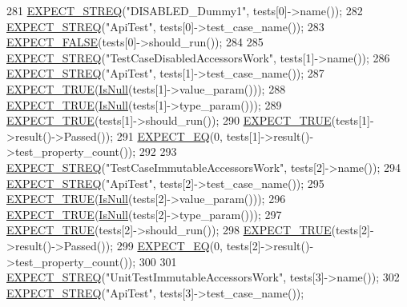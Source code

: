 \begin{DoxyCode}
281     \hyperlink{gtest_8h_ad20f7b94ac5081e16f0005b94e95f0c6}{EXPECT\_STREQ}(\textcolor{stringliteral}{"DISABLED\_Dummy1"}, tests[0]->name());
282     \hyperlink{gtest_8h_ad20f7b94ac5081e16f0005b94e95f0c6}{EXPECT\_STREQ}(\textcolor{stringliteral}{"ApiTest"}, tests[0]->test\_case\_name());
283     \hyperlink{gtest_8h_aeb6c7ae89f440c90c1a1815951c836da}{EXPECT\_FALSE}(tests[0]->should\_run());
284 
285     \hyperlink{gtest_8h_ad20f7b94ac5081e16f0005b94e95f0c6}{EXPECT\_STREQ}(\textcolor{stringliteral}{"TestCaseDisabledAccessorsWork"}, tests[1]->name());
286     \hyperlink{gtest_8h_ad20f7b94ac5081e16f0005b94e95f0c6}{EXPECT\_STREQ}(\textcolor{stringliteral}{"ApiTest"}, tests[1]->test\_case\_name());
287     \hyperlink{gtest_8h_ac33e7cdfb5d44a7a0f0ab552eb5c3c6a}{EXPECT\_TRUE}(\hyperlink{namespacetesting_1_1internal_adcfd37a66bc4cb0e8291cf46e1a6c72b}{IsNull}(tests[1]->value\_param()));
288     \hyperlink{gtest_8h_ac33e7cdfb5d44a7a0f0ab552eb5c3c6a}{EXPECT\_TRUE}(\hyperlink{namespacetesting_1_1internal_adcfd37a66bc4cb0e8291cf46e1a6c72b}{IsNull}(tests[1]->type\_param()));
289     \hyperlink{gtest_8h_ac33e7cdfb5d44a7a0f0ab552eb5c3c6a}{EXPECT\_TRUE}(tests[1]->should\_run());
290     \hyperlink{gtest_8h_ac33e7cdfb5d44a7a0f0ab552eb5c3c6a}{EXPECT\_TRUE}(tests[1]->result()->Passed());
291     \hyperlink{gtest_8h_a4159019abda84f5366acdb7604ff220a}{EXPECT\_EQ}(0, tests[1]->result()->test\_property\_count());
292 
293     \hyperlink{gtest_8h_ad20f7b94ac5081e16f0005b94e95f0c6}{EXPECT\_STREQ}(\textcolor{stringliteral}{"TestCaseImmutableAccessorsWork"}, tests[2]->name());
294     \hyperlink{gtest_8h_ad20f7b94ac5081e16f0005b94e95f0c6}{EXPECT\_STREQ}(\textcolor{stringliteral}{"ApiTest"}, tests[2]->test\_case\_name());
295     \hyperlink{gtest_8h_ac33e7cdfb5d44a7a0f0ab552eb5c3c6a}{EXPECT\_TRUE}(\hyperlink{namespacetesting_1_1internal_adcfd37a66bc4cb0e8291cf46e1a6c72b}{IsNull}(tests[2]->value\_param()));
296     \hyperlink{gtest_8h_ac33e7cdfb5d44a7a0f0ab552eb5c3c6a}{EXPECT\_TRUE}(\hyperlink{namespacetesting_1_1internal_adcfd37a66bc4cb0e8291cf46e1a6c72b}{IsNull}(tests[2]->type\_param()));
297     \hyperlink{gtest_8h_ac33e7cdfb5d44a7a0f0ab552eb5c3c6a}{EXPECT\_TRUE}(tests[2]->should\_run());
298     \hyperlink{gtest_8h_ac33e7cdfb5d44a7a0f0ab552eb5c3c6a}{EXPECT\_TRUE}(tests[2]->result()->Passed());
299     \hyperlink{gtest_8h_a4159019abda84f5366acdb7604ff220a}{EXPECT\_EQ}(0, tests[2]->result()->test\_property\_count());
300 
301     \hyperlink{gtest_8h_ad20f7b94ac5081e16f0005b94e95f0c6}{EXPECT\_STREQ}(\textcolor{stringliteral}{"UnitTestImmutableAccessorsWork"}, tests[3]->name());
302     \hyperlink{gtest_8h_ad20f7b94ac5081e16f0005b94e95f0c6}{EXPECT\_STREQ}(\textcolor{stringliteral}{"ApiTest"}, tests[3]->test\_case\_name());

\end{DoxyCode}

